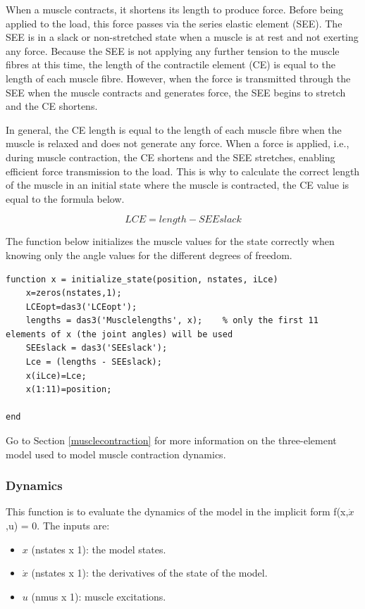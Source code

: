 When a muscle contracts, it shortens its length to produce force. Before being applied to the load, this force passes via the series elastic element (SEE). The SEE is in a slack or non-stretched state when a muscle is at rest and not exerting any force. Because the SEE is not applying any further tension to the muscle fibres at this time, the length of the contractile element (CE) is equal to the length of each muscle fibre. However, when the force is transmitted through the SEE when the muscle contracts and generates force, the SEE begins to stretch and the CE shortens. 

In general, the CE length is equal to the length of each muscle fibre when the muscle is relaxed and does not generate any force. When a force is applied, i.e., during muscle contraction, the CE shortens and the SEE stretches, enabling efficient force transmission to the load. This is why to calculate the correct length of the muscle in an initial state where the muscle is contracted, the CE value is equal to the formula below.

\begin{equation}
    LCE = length - SEEslack \label{LCE}
\end{equation}

The function below initializes the muscle values for the state correctly when knowing only the angle values for the different degrees of freedom.\newpage

\begin{lstlisting}[style=Matlab-editor]
function x = initialize_state(position, nstates, iLce)
    x=zeros(nstates,1);
    LCEopt=das3('LCEopt');
    lengths = das3('Musclelengths', x);    % only the first 11 elements of x (the joint angles) will be used
    SEEslack = das3('SEEslack');
    Lce = (lengths - SEEslack);
    x(iLce)=Lce;
    x(1:11)=position;

end
\end{lstlisting}

Go to Section \ref{musclecontraction} for more information on the three-element model used to model muscle contraction dynamics. \newline

\subsubsection{Dynamics} \label{sec:dynamics}
This function is to evaluate the dynamics of the model in the implicit form f(x,$\dot{x}$,u) = 0.
The inputs are:
\begin{itemize}
    \item $x$ (nstates x 1): the model states.
    \item $\dot{x}$ (nstates x 1): the derivatives of the state of the model.
    \item $u$ (nmus x 1): muscle excitations.
\end{itemize}

